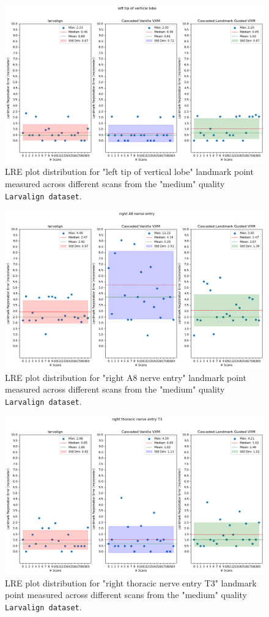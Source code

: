 \documentclass{book}
\begin{document}
	\begin{figure}[h]
		\centering
		\includegraphics[width=0.75\columnwidth]{resources/chapter5_fresh/output/left tip of vertical lobe.png}
		\caption{LRE plot distribution for "left tip of vertical lobe" landmark point measured across different scans from the "medium" quality \texttt{Larvalign dataset}.}
		\label{fig:landmark6}
	\end{figure}
	
	\begin{figure}[h]
		\centering
		\includegraphics[width=0.75\columnwidth]{resources/chapter5_fresh/output/right A8 nerve entry.png}
		\caption{LRE plot distribution for "right A8 nerve entry" landmark point measured across different scans from the "medium" quality \texttt{Larvalign dataset}.}
		\label{fig:landmark7}
	\end{figure}
	
	\begin{figure}[h]
		\centering
		\includegraphics[width=0.75\columnwidth]{resources/chapter5_fresh/output/right thoracic nerve entry T3.png}
		\caption{LRE plot distribution for "right thoracic nerve entry T3" landmark point measured across different scans from the "medium" quality \texttt{Larvalign dataset}.}
		\label{fig:landmark8}
	\end{figure}
	
\end{document}
